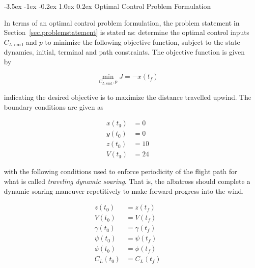 \documentclass[11pt,letterpaper,onecolumn]{article}
\makeatletter
\renewcommand\section{\@startsection{section}{1}{\z@}%
 {-3.5ex \@plus-1ex \@minus-0.2ex}%
 {1.0ex \@plus0.2ex}%
 {\fontsize{12pt}{12pt}\selectfont\bfseries\sffamily}}
\renewcommand\subsection{\@startsection{subsection}{1}{\z@}%
 {-3.5ex \@plus-1ex \@minus-0.2ex}%
 {0.5ex \@plus0.2ex}%
 {\fontsize{10pt}{10pt}\selectfont\bfseries\sffamily}}
\makeatother
\begin{document}
%

\section{Optimal Control Problem Formulation}\label{sec.optimalproblem}

In terms of an optimal control problem formulation, the problem statement in Section~\ref{sec.problemstatement} is stated as: determine the optimal control inputs $C_{L,\text{cmd}}$ and $p$ to minimize the following objective function, subject to the state dynamics, initial, terminal and path constraints.
The objective function is given by

\begin{equation*}
  \min_{C_{L,\text{cmd}},p}J=-x(t_{f})
\end{equation*}

indicating the desired objective is to maximize the distance travelled upwind.
The boundary conditions are given as

\begin{equation*}
  \begin{split}
    x(t_{0})  &= 0 \\
    y(t_{0})  &= 0 \\
    z(t_{0})  &= 10 \\
    V(t_{0})  &= 24
  \end{split}
\end{equation*}

with the following conditions used to enforce periodicity of the flight path for what is called \textit{traveling dynamic soaring}.
That is, the albatross should complete a dynamic soaring maneuver repetitively to make forward progress into the wind.

\begin{equation*}
  \begin{split}
    z(t_{0})      &= z(t_{f}) \\
    V(t_{0})      &= V(t_{f}) \\
    \gamma(t_{0}) &= \gamma(t_{f}) \\
    \psi(t_{0})   &= \psi(t_{f}) \\
    \phi(t_{0})   &= \phi(t_{f}) \\
    C_{L}(t_{0})  &= C_{L}(t_{f})
  \end{split}
\end{equation*}
\end{document}
